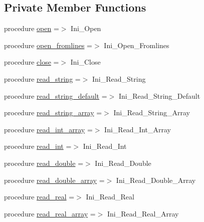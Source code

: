 \subsection*{Private Member Functions}
\begin{DoxyCompactItemize}
\item 
procedure \mbox{\hyperlink{structiniobjects_1_1tinifile_a8df72d8e6d30c3ec67a48be9f7931237}{open}} =$>$ Ini\+\_\+\+Open
\item 
procedure \mbox{\hyperlink{structiniobjects_1_1tinifile_a11870953424653f03a444cdb77064275}{open\+\_\+fromlines}} =$>$ Ini\+\_\+\+Open\+\_\+\+Fromlines
\item 
procedure \mbox{\hyperlink{structiniobjects_1_1tinifile_a4f5667e2deeffdd66857bd082b866676}{close}} =$>$ Ini\+\_\+\+Close
\item 
procedure \mbox{\hyperlink{structiniobjects_1_1tinifile_aebec72d006bc6a5e61025df2371dd740}{read\+\_\+string}} =$>$ Ini\+\_\+\+Read\+\_\+\+String
\item 
procedure \mbox{\hyperlink{structiniobjects_1_1tinifile_a5d57a31ba4d3a2633082cc234d39becc}{read\+\_\+string\+\_\+default}} =$>$ Ini\+\_\+\+Read\+\_\+\+String\+\_\+\+Default
\item 
procedure \mbox{\hyperlink{structiniobjects_1_1tinifile_ab51d9d03ffada9ca0f73738abeefc286}{read\+\_\+string\+\_\+array}} =$>$ Ini\+\_\+\+Read\+\_\+\+String\+\_\+\+Array
\item 
procedure \mbox{\hyperlink{structiniobjects_1_1tinifile_a7a41bd8dc01019a60ce529ab146bd753}{read\+\_\+int\+\_\+array}} =$>$ Ini\+\_\+\+Read\+\_\+\+Int\+\_\+\+Array
\item 
procedure \mbox{\hyperlink{structiniobjects_1_1tinifile_a1117874e12501004c8e65e8dde6368f6}{read\+\_\+int}} =$>$ Ini\+\_\+\+Read\+\_\+\+Int
\item 
procedure \mbox{\hyperlink{structiniobjects_1_1tinifile_a76e9a97990063d3afa2fbfd43e97593d}{read\+\_\+double}} =$>$ Ini\+\_\+\+Read\+\_\+\+Double
\item 
procedure \mbox{\hyperlink{structiniobjects_1_1tinifile_ab0ce2642ff33fe42acaa795aa189d758}{read\+\_\+double\+\_\+array}} =$>$ Ini\+\_\+\+Read\+\_\+\+Double\+\_\+\+Array
\item 
procedure \mbox{\hyperlink{structiniobjects_1_1tinifile_a73ed17b219753063f3b9967bcec298fb}{read\+\_\+real}} =$>$ Ini\+\_\+\+Read\+\_\+\+Real
\item 
procedure \mbox{\hyperlink{structiniobjects_1_1tinifile_af7c8b658702fa119c1509a6aa017ad7d}{read\+\_\+real\+\_\+array}} =$>$ Ini\+\_\+\+Read\+\_\+\+Real\+\_\+\+Array

\end{DoxyCompactItemize}
